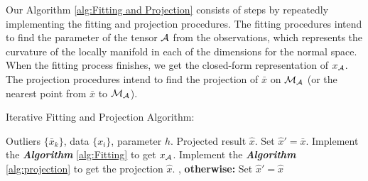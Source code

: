 \documentclass{article}
\theoremstyle{remark}
\begin{document}
Our Algorithm \ref{alg:Fitting and Projection} consists of steps by repeatedly implementing the fitting and projection procedures. The fitting procedures intend to find the parameter of the tensor $\cal A$ from the observations, which represents the curvature of the locally manifold in each of the dimensions for the normal space. When the fitting process finishes, we get the closed-form representation of $x_{\cal A}$. The projection procedures intend to find the projection of $\bar{x}$ on $\cal M_A$ (or the nearest point from  $\bar{x}$ to $\cal M_A$). %
\begin{algorithm}[H]
\caption{Iterative Fitting and Projection Algorithm:}
\label{alg:Fitting and Projection}
\begin{algorithmic}
 Outliers $\{\bar{x}_k\}$, data $\{x_i\}$, parameter $h$.
 Projected result $\hat{x}$.
\STATE Set $\hat{x}' = \bar{x}$.
\REPEAT
\STATE Implement the {\bfseries {\it  Algorithm}} \ref{alg:Fitting} to get $x_{\cal A}$.
\STATE Implement the {\bfseries {\it  Algorithm}} \ref{alg:projection} to get the projection $\hat{x}$.
, {\bfseries otherwise:} Set $\hat{x}'=\hat{x}$
\ENDFOR
\end{algorithmic}
\end{algorithm}
%
\end{document}
